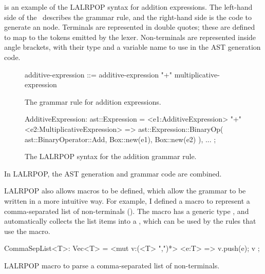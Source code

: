 \documentclass[00-main.tex]{subfiles}
\begin{document}
 is an example of the LALRPOP syntax for addition expressions.
The left-hand side of the~\RustInline{=>} describes the grammar rule, and the right-hand side is the code to generate an  node.
Terminals are represented in double quotes; these are defined to map to the tokens emitted by the lexer.
Non-terminals are represented inside angle brackets, with their type and a variable name to use in the AST generation code.

\begin{listing}[!ht]
  \begin{subfigure}[t]{\textwidth}
    \begin{GrammarListing}
      additive-expression ::= additive-expression "+" multiplicative-expression
    \end{GrammarListing}
    \caption{The grammar rule for addition expressions.}
  \end{subfigure}
  \par\medskip %
  \begin{subfigure}[t]{\textwidth}
    \begin{RustListing}
      AdditiveExpression: ast::Expression = {
          <e1:AdditiveExpression> "+" <e2:MultiplicativeExpression>
              => ast::Expression::BinaryOp(
                  ast::BinaryOperator::Add,
                  Box::new(e1),
                  Box::new(e2)
              ),
          ...
      };
    \end{RustListing}
    \caption{The LALRPOP syntax for the addition grammar rule.}
  \end{subfigure}
  \caption{In LALRPOP, the AST generation and grammar code are combined.}
  \label{lst:AST generation code example}
\end{listing}

LALRPOP also allows macros to be defined, which allow the grammar to be written in a more intuitive way.
For example, I defined a macro to represent a comma-separated list of non-terminals ().
The macro has a generic type , and automatically collects the list items into a , which can be used by the rules that use the macro.

\begin{listing}[!ht]
  \begin{RustListing}
    CommaSepList<T>: Vec<T> = {
        <mut v:(<T> ",")*> <e:T> => {
            v.push(e);
            v
        }
    };
  \end{RustListing}
  \caption{LALRPOP macro to parse a comma-separated list of non-terminals.}
  \label{lst:parser macro for comma-separated list}
\end{listing}
\end{document}
